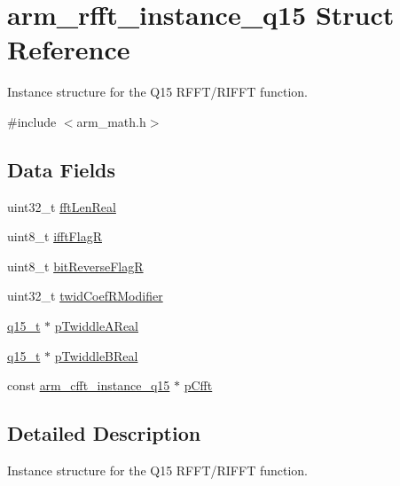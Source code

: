 \hypertarget{structarm__rfft__instance__q15}{}\section{arm\+\_\+rfft\+\_\+instance\+\_\+q15 Struct Reference}
\label{structarm__rfft__instance__q15}


Instance structure for the Q15 R\+F\+F\+T/\+R\+I\+F\+FT function.  




{\ttfamily \#include $<$arm\+\_\+math.\+h$>$}

\subsection*{Data Fields}
\begin{DoxyCompactItemize}
\item 
uint32\+\_\+t \mbox{\hyperlink{structarm__rfft__instance__q15_adf0d4604cf5546075d9d4cf122d6c986}{fft\+Len\+Real}}
\item 
uint8\+\_\+t \mbox{\hyperlink{structarm__rfft__instance__q15_a787d72055c89e4d62b188d6bd646341c}{ifft\+FlagR}}
\item 
uint8\+\_\+t \mbox{\hyperlink{structarm__rfft__instance__q15_ad56ec2425e2422108b8767b43d944591}{bit\+Reverse\+FlagR}}
\item 
uint32\+\_\+t \mbox{\hyperlink{structarm__rfft__instance__q15_a5b06f7f76c018db993fe6acc5708c589}{twid\+Coef\+R\+Modifier}}
\item 
\mbox{\hyperlink{arm__math_8h_ab5a8fb21a5b3b983d5f54f31614052ea}{q15\+\_\+t}} $\ast$ \mbox{\hyperlink{structarm__rfft__instance__q15_ac17beaa033ab1ea242d49037276b67e2}{p\+Twiddle\+A\+Real}}
\item 
\mbox{\hyperlink{arm__math_8h_ab5a8fb21a5b3b983d5f54f31614052ea}{q15\+\_\+t}} $\ast$ \mbox{\hyperlink{structarm__rfft__instance__q15_a67a618de57c3a7420ee05fda1a80bf3a}{p\+Twiddle\+B\+Real}}
\item 
const \mbox{\hyperlink{structarm__cfft__instance__q15}{arm\+\_\+cfft\+\_\+instance\+\_\+q15}} $\ast$ \mbox{\hyperlink{structarm__rfft__instance__q15_abd0c3c04ec88379f48e51447e95f092a}{p\+Cfft}}
\end{DoxyCompactItemize}


\subsection{Detailed Description}
Instance structure for the Q15 R\+F\+F\+T/\+R\+I\+F\+FT function. 

